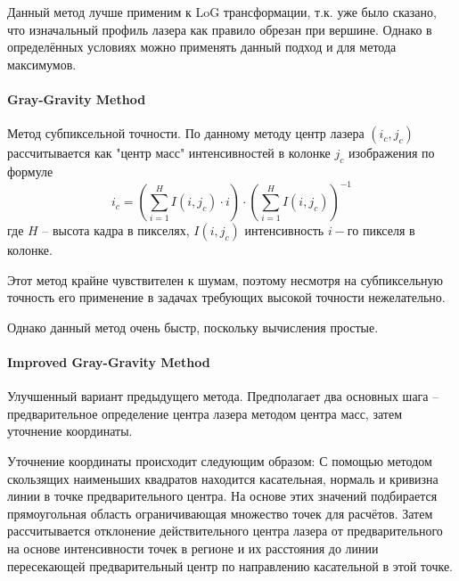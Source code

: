                Данный метод лучше применим к LoG трансформации, т.к. уже было сказано, что изначальный профиль лазера как правило обрезан при вершине. Однако в определённых условиях можно применять данный подход и для метода максимумов.
            
            \paragraph{Gray-Gravity Method} 
                Метод субпиксельной точности\cite{Li2017}. 
                По данному методу центр лазера $ (i_c, j_c) $ рассчитывается как "центр масс" интенсивностей в колонке $ j_c $ изображения по формуле
                \begin{equation}
                    i_c = \left(\sum\limits_{i=1}^{H}I(i, j_c)\cdot i\right)\cdot\left(\sum\limits_{i=1}^{H}I(i, j_c)\right)^{-1}
                \end{equation}
                где $ H $ -- высота кадра в пикселях, $ I(i, j_c) $ интенсивность $ i-\textit{го} $ пикселя в колонке.
                
                Этот метод крайне чувствителен к шумам, поэтому несмотря на субпиксельную точность его применение в задачах требующих высокой точности нежелательно.
                
                Однако данный метод очень быстр, поскольку вычисления простые.
                
            \paragraph{Improved Gray-Gravity Method}
                Улучшенный вариант предыдущего метода\cite{Li2017}. Предполагает два основных шага -- предварительное определение центра лазера методом центра масс, затем уточнение координаты.
                
                Уточнение координаты происходит следующим образом:
                С помощью методом скользящих наименьших квадратов находится касательная, нормаль и кривизна линии в точке предварительного центра. На основе этих значений подбирается прямоугольная область ограничивающая множество точек для расчётов. Затем рассчитывается отклонение действительного центра лазера от предварительного на основе интенсивности точек в регионе и их расстояния до линии пересекающей предварительный центр по направлению касательной в этой точке.
                
